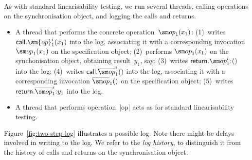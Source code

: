 As with standard linearisability testing, we run several threads, calling
operations on the synchronisation object, and logging the calls and returns. 
%
\begin{itemize}
\item A thread that performs the concrete operation~$\op_1(x_1)$: (1)~writes
  $\call.\sm{op}_1^i(x_1)$ into the log, associating it with a corresponding
  invocation $\op_1(x_1)$ on the specification object; (2)~performs
  $\op_1(x_1)$ on the synchonisation object, obtaining result~$y_1$, say;
  (3)~writes $\return.\op_1^i \:: ()$ into the log; (4)~writes
  $\call.\overline{\op}_1^i()$ into the log, associating it with a
  corresponding invocation $\overline{\op}_1()$ on the specification object;
  (5)~writes $\return.\overline{\op}_1^i \:: y_1$ into the log.

\item A thread that performs operation~|op| acts as for standard
  linearisability testing.
\end{itemize}
%
Figure~\ref{fig:two-step-log} illustrates a possible log.
%
Note there might be delays involved in writing to the log.  We refer to the
\emph{log history}, to distinguish it from the history of calls and returns on
the synchronisation object.  


